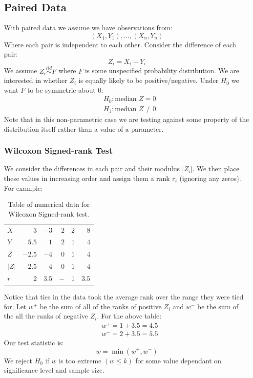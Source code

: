 \documentclass[12pt]{article}
\newcommand{\iid}{\overset{iid}{\sim}}
\begin{document}
\subsection{Paired Data}
With paired data we assume we have observations from:
\[(X_1,Y_1),\dots,(X_n,Y_n)\]
Where each pair is independent to each other. Consider the difference of each pair:
\[Z_i=X_i-Y_i\]
We assume \(Z_i\iid F\) where \(F\) is some unspecified probability distribution. We are interested in whether \(Z_i\) is equally likely to be positive/negative. Under \(H_0\) we want \(F\) to be symmetric about \(0\):
\begin{align*}
    &H_0:\text{median } Z=0 \\
    &H_1: \text{median } Z\ne0
\end{align*}
Note that in this non-parametric case we are testing against some property of the distribution itself rather than a value of a parameter.
\subsubsection{Wilcoxon Signed-rank Test}
We consider the differences in each pair and their modulus \(|Z_i|\). We then place these values in increasing order and assign them a rank \(r_i\) (ignoring any zeros). For example:
\begin{table}[H]
    \centering
    \begin{tabular}{lrrrrr}
        \multicolumn{1}{l|}{\(X\)} & \(3\) & \(-3\) & \(2\) & \(2\) & \(8\) \\
        \multicolumn{1}{l|}{\(Y\)} & \(5.5\) & \(1\) & \(2\) & \(1\) & \(4\) \\ \hline
        \multicolumn{1}{l|}{\(Z\)}  & \(-2.5\) & \(-4\) & \(0\) & \(1\) & \(4\) \\
        \multicolumn{1}{l|}{\(|Z|\)} & \(2.5\) & \(4\) & \(0\) & \(1\) & \(4\) \\
        \multicolumn{1}{l|}{\(r\)}  & \(2\) & \(3.5\) & \(-\) & \(1\) & \(3.5\)
    \end{tabular}
    \caption{Table of numerical data for Wilcoxon Signed-rank test.}
\end{table}
Notice that ties in the data took the average rank over the range they were tied for. Let \(w^+\) be the sum of all of the ranks of positive \(Z_i\) and \(w^-\) be the sum of the all the ranks of negative \(Z_i\). For the above table:
\begin{align*}
    &w^+=1+3.5=4.5 \\
    &w^-=2+3.5=5.5
\end{align*}
Our test statistic is:
\[w=\min(w^+,w^-)\]
We reject \(H_0\) if \(w\) is too extreme \((w\leq k)\) for some value dependant on significance level and sample size.
\end{document}
